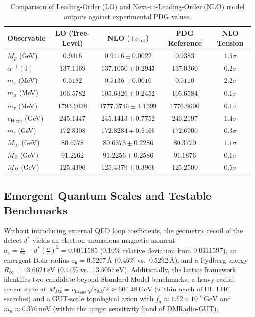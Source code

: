 \documentclass[11pt,a4paper]{article}
\begin{document}
\begin{table}[ht!]
\centering
\caption{Comparison of Leading-Order (LO) and Next-to-Leading-Order (NLO) model outputs against experimental PDG values.}
\label{tab:sm_results}
\begin{tabular}{lcccc}
\toprule
\textbf{Observable} & \textbf{LO (Tree-Level)} & \textbf{NLO ($\pm \sigma_{\mathrm{tot}}$)} & \textbf{PDG Reference} & \textbf{NLO Tension} \\
\midrule
$M_p$ (GeV) & $0.9416$ & $0.9416 \pm 0.0022$ & $0.9383$ & $1.5\sigma$ \\
$\alpha^{-1}(0)$ & $137.1069$ & $137.1050 \pm 0.2943$ & $137.0360$ & $0.2\sigma$ \\
$m_e$ (MeV) & $0.5182$ & $0.5136 \pm 0.0016$ & $0.5110$ & $2.2\sigma$ \\
$m_\mu$ (MeV) & $106.5782$ & $105.6326 \pm 0.2452$ & $105.6584$ & $0.1\sigma$ \\
$m_\tau$ (MeV) & $1793.2838$ & $1777.3743 \pm 4.1399$ & $1776.8600$ & $0.1\sigma$ \\
$v_{\mathrm{Higgs}}$ (GeV) & $245.1447$ & $245.1413 \pm 0.7752$ & $246.2197$ & $1.4\sigma$ \\
$m_t$ (GeV) & $172.8308$ & $172.8284 \pm 0.5465$ & $172.6900$ & $0.3\sigma$ \\
$M_W$ (GeV) & $80.6378$ & $80.6373 \pm 0.2286$ & $80.3770$ & $1.1\sigma$ \\
$M_Z$ (GeV) & $91.2262$ & $91.2256 \pm 0.2586$ & $91.1876$ & $0.1\sigma$ \\
$M_H$ (GeV) & $125.4396$ & $125.4379 \pm 0.3966$ & $125.2500$ & $0.5\sigma$ \\
\bottomrule
\end{tabular}
\end{table}

\subsection{Emergent Quantum Scales and Testable Benchmarks}
Without introducing external QED loop coefficients, the geometric recoil of the defect $d^*$ yields an electron anomalous magnetic moment $a_e = \frac{\alpha}{2\pi} - d^*\left(\frac{\alpha}{\pi}\right)^2 = 0.0011585$ ($0.10\%$ relative deviation from $0.0011597$), an emergent Bohr radius $a_0 = 0.5267\,\text{\AA}$ ($0.46\%$ vs.\ $0.5292\,\text{\AA}$), and a Rydberg energy $R_\infty = 13.6621\,\mathrm{eV}$ ($0.41\%$ vs.\ $13.6057\,\mathrm{eV}$). Additionally, the lattice framework identifies two candidate beyond-Standard-Model benchmarks: a heavy radial scalar state at $M_{H2} = v_{\mathrm{Higgs}}\sqrt{z_{3d}/2} \approx 600.48\,\mathrm{GeV}$ (within reach of HL-LHC searches) and a GUT-scale topological axion with $f_a \approx 1.52 \times 10^{16}\,\mathrm{GeV}$ and $m_a \approx 0.376\,\mathrm{neV}$ (within the target sensitivity band of DMRadio-GUT).
\end{document}
